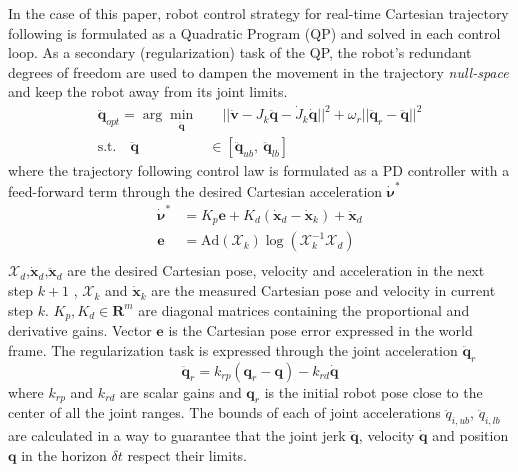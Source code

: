 In the case of this paper, robot control strategy for real-time Cartesian trajectory following is formulated as a Quadratic Program (QP) and solved in each control loop. As a secondary (regularization) task of the QP, the robot's redundant degrees of freedom are used to dampen the movement in the trajectory \textit{null-space} and keep the robot away from its joint limits.
\begin{equation}
\begin{split}
    \ddot{\bm{q}}_{opt} = \arg \min_{\ddot{\bm{q}}}& \quad || \dot{\bm{v}} - J_k\ddot{\bm{q}} - \dot{J}_k\dot{\bm{q}} ||^2 + \omega_r || \ddot{\bm{q}}_r - \ddot{\bm{q}} ||^2 \\
    \text{s.t.} \quad \ddot{\bm{q}} &\in [\ddot{\bm{q}}_{ub}, ~\ddot{\bm{q}}_{lb}]
\end{split}
\end{equation}
where the trajectory following  control law is formulated as a PD controller with a feed-forward term through the desired Cartesian acceleration $\dot{\bm{\nu}}^*$
\begin{equation}
\begin{split}
    \dot{\bm{\nu}}^* &= K_p \bm{e} + K_d(\dot{\bm{x}}_{d} - \dot{\bm{x}}_k) + \ddot{\bm{x}}_{d} \\
    \bm{e} &= \text{Ad}(\mathcal{X}_k) \log(\mathcal{X}_k^{-1}\mathcal{X}_{d})\\
\end{split}
\end{equation}
$\mathcal{X}_d$,$\dot{\bm{x}}_d$,$\ddot{\bm{x}}_d$ are the desired Cartesian pose, velocity and acceleration in the next step $k+1$ , $\mathcal{X}_{k}$ and $\dot{\bm{x}}_{k}$ are the measured Cartesian pose and velocity in current step $k$. $K_p,K_d\in \mathbf{R}^m$ are diagonal matrices containing the proportional and derivative gains. Vector $\bm{e}$ is the Cartesian pose error expressed in the world frame. The regularization task is expressed through the joint acceleration $\ddot{\bm{q}}_r$
\begin{equation}
    \ddot{\bm{q}}_r = k_{rp}(\bm{q}_{r} - \bm{q}) - k_{rd}\dot{\bm{q}}
\end{equation}
where $k_{rp}$ and $k_{rd}$ are scalar gains and $\bm{q}_{r}$ is the initial robot pose close to the center of all the joint ranges. The bounds of each of joint accelerations $\ddot{{q}}_{i,ub}$, $\ddot{{q}}_{i,lb}$ are calculated in a way to guarantee that the joint jerk $\dddot{\bm{q}}$, velocity $\dot{\bm{q}}$ and position $\bm{q}$ in the horizon $\delta t$ respect their limits. 
